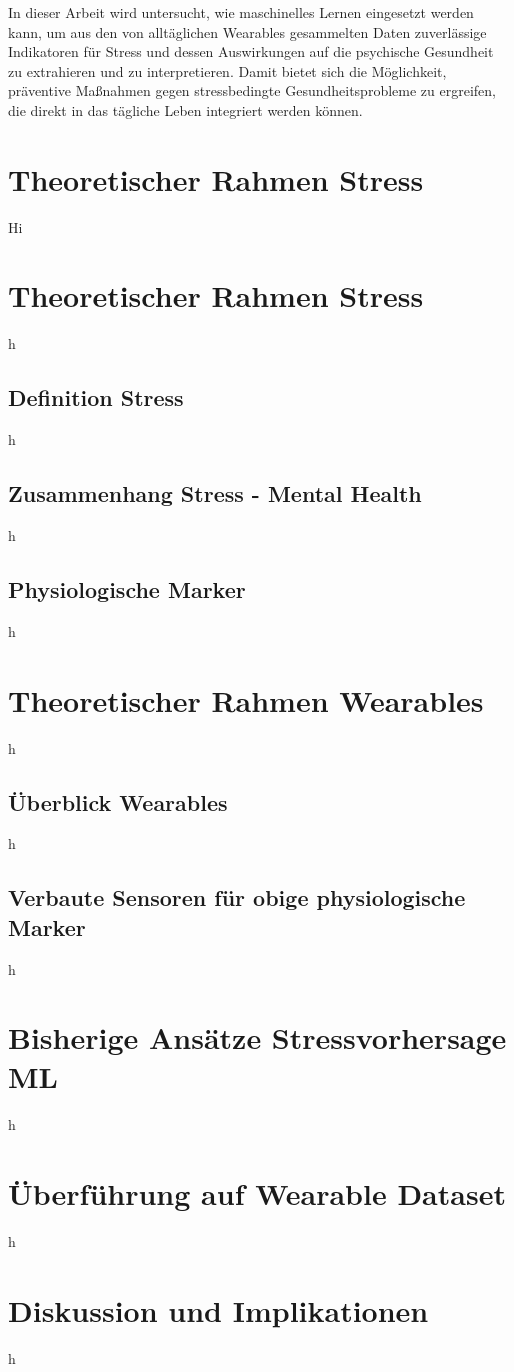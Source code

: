 In dieser Arbeit wird untersucht, wie maschinelles Lernen eingesetzt werden kann, um aus den von alltäglichen Wearables gesammelten Daten zuverlässige Indikatoren für Stress und dessen Auswirkungen auf die psychische Gesundheit zu extrahieren und zu interpretieren. Damit bietet sich die Möglichkeit, präventive Maßnahmen gegen stressbedingte Gesundheitsprobleme zu ergreifen, die direkt in das tägliche Leben integriert werden können.
\section{Theoretischer Rahmen Stress}
Hi
\section{Theoretischer Rahmen Stress}
h
\subsection{Definition Stress}
h
\subsection{Zusammenhang Stress - Mental Health}
h
\subsection{Physiologische Marker}
h
\section{Theoretischer Rahmen Wearables}
h
\subsection{Überblick Wearables}
h
\subsection{Verbaute Sensoren für obige physiologische Marker}
h
\section{Bisherige Ansätze Stressvorhersage ML}
h
\section{Überführung auf Wearable Dataset}
h
\section{Diskussion und Implikationen}
h